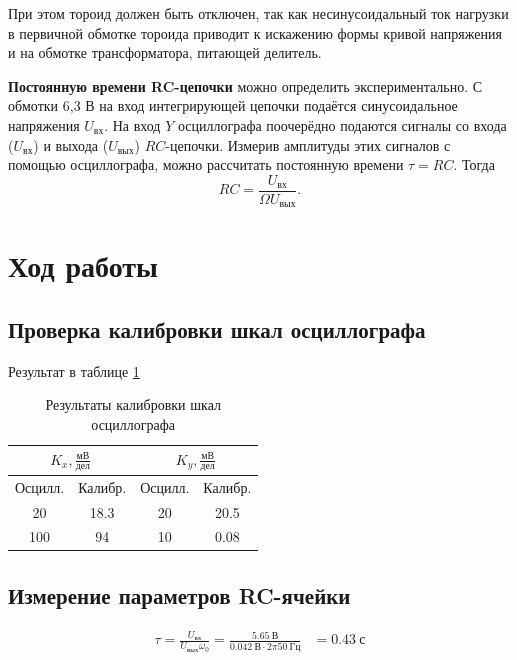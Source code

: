 \documentclass[a4paper, 12pt]{article}
\begin{document}
        При этом тороид должен быть отключен, так как несинусоидальный ток нагрузки в первичной обмотке тороида приводит к искажению формы кривой напряжения и на обмотке трансформатора, питающей делитель.

        \textbf{Постоянную времени RC-цепочки} можно определить экспериментально. С обмотки 6,3 В на вход интегрирующей цепочки подаётся синусоидальное напряжения $U_{\text{вх}}$. На вход $Y$ осциллографа поочерёдно подаются сигналы со входа ($U_{\text{вх}}$) и выхода ($U_{\text{вых}}$) $RC$-цепочки. Измерив амплитуды этих сигналов с помощью осциллографа, можно рассчитать постоянную времени $\tau=RC$. Тогда\[RC=\frac{U_{\text{вх}}}{\Omega U_{\text{вых}}}.\]

    \section{Ход работы}

        \subsection{Проверка калибровки шкал осциллографа}

            Результат в таблице \ref{tab:calibr}

            \begin{table}[!ht]
                \centering
                \begin{tabular}{|c|c|c|c|}
                    \hline

                    \multicolumn{2}{|c|}{$K_x, \frac{мВ}{дел}$} & \multicolumn{2}{c|}{$K_y, \frac{мВ}{дел}$} \\ \hline
                    Осцилл. & Калибр. & Осцилл. & Калибр.\\ \hline
                    20 & 18.3 & 20 & 20.5\\ \hline
                    100 & 94 & 10 & 0.08\\ \hline

                \end{tabular}
                \caption{Результаты калибровки шкал осциллографа}
                \label{tab:calibr}
            \end{table}

        \subsection{Измерение параметров RC-ячейки}

            \begin{align*}
                \tau = \frac{U_{вх}}{U_{вых} \omega_0} = \frac{5.65~В}{0.042~В \cdot 2\pi50~Гц} &= 0.43~с
            \end{align*}
\end{document}
